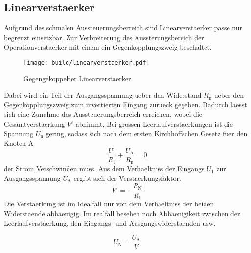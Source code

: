 \subsection{Linearverstaerker}%
\label{sub:linearverstaerker}
Aufgrund des schmalen Aussteuerungsberreich sind Linearverstaerker passe nur
begrenzt einsetzbar.
Zur Verbreiterung des Aussterungsbereich der Operationverstaerker mit einem 
ein Gegenkopplungszweig beschaltet.
\begin{figure}[h]
		\centering
		\texttt{[image: build/linearverstaerker.pdf]}
		\caption{Gegengekoppelter Linearverstaerker}
		\label{fig:lin}
\end{figure}
Dabei wird ein Teil der Ausgangsspannung ueber den Widerstand $R_\text{n}$ ueber
den Gegenkopplungszweig zum invertierten Eingang zurueck gegeben. 
Dadurch laesst sich eine Zunahme des Aussteuerungsberreich erreichen, wobei die
Gesamtverstaerkung $V'$ abnimmt.
Bei grossen Leerlaufverstaerkungen ist die Spannung $U_\text{n}$ gering, sodass
sich nach dem ersten Kirchhoffschen Gesetz fuer den Knoten A
\begin{equation}
		\frac{U_1}{R_1} + \frac{U_\text{A}}{R_\text{n}} = 0
\end{equation}
der Strom Verschwinden muss. 
Aus dem Verhaeltniss der Eingangs $U_1$ zur Ausgangsspannung $U_\text{A}$ ergibt
sich der Verstaerkungsfaktor.
\begin{equation}
		V' = - \frac{R_\text{N}}{R_1}
\end{equation}
Die Verstaerkung ist im Idealfall nur von dem Verhaeltniss der beiden
Widerstaende abhaenigig. 
Im realfall besehen noch Abhaenigikeit zwischen der Leerlaufverstaerkung, den
Eingangs- und Ausgangswiderstaenden usw. 

\begin{equation}
		U_\text{N} = \frac{U_\text{A}}{V}	
\end{equation}
